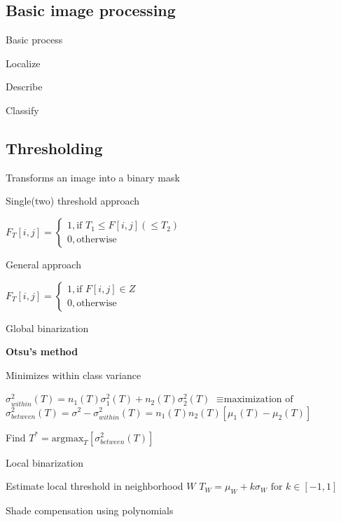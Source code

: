 \documentclass{article}
\begin{document}
\begin{multicols*}{2}
{\section{Basic image processing}

Basic process

\begin{compactitem}
	\item Localize
	\item Describe
	\item Classify
\end{compactitem}

\subsection{Thresholding}

Transforms an image into a binary mask

\begin{compactitem}
	\item Single(two) threshold approach
	
	$F_T[i,j] = \begin{cases}
		1, \text{if } T_1 \leq F[i,j] (\leq T_2) \\
		0, \text{otherwise}
	\end{cases}$
	
	\item General approach
	
	$F_T[i,j] = \begin{cases}
		1, \text{if } F[i,j] \in Z \\
		0, \text{otherwise}
	\end{cases}$

	\item Global binarization
	
	\textbf{Otsu's method}
	
	Minimizes within class variance
	
	$\sigma^2_{within}(T) = n_1(T)\sigma^2_1(T) + n_2(T)\sigma^2_2(T)$
	$\equiv \text{maximization of}$
	$\sigma^2_{between}(T) = \sigma^2-\sigma^2_{within}(T) = n_1(T)n_2(T)[\mu_1(T)-\mu_2(T)]$
	
	Find $T^* = \text{argmax}_T[\sigma^2_{between}(T)]$
	
	\item Local binarization
	
	Estimate local threshold in neighborhood $W$
	$T_W = \mu_W + k\sigma_W \text{ for } k \in [-1,1]$
	
	\item Shade compensation using polynomials
\end{compactitem}

}
\end{multicols*}
\end{document}
